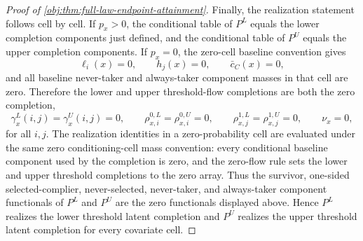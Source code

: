 \documentclass[11pt]{article}
\begin{document}
\begin{proof}[Proof of \cref{obj:thm:full-law-endpoint-attainment}]
Finally, the realization statement follows cell by cell.  If \(p_x>0\), the conditional table of \(P^L\) equals the lower completion components just defined, and the conditional table of \(P^U\) equals the upper completion components. %
If \(p_x=0\), the zero-cell baseline convention gives
\[
\ell_i(x)=0,\qquad h_j(x)=0,\qquad \bar c_C(x)=0,
\]
and all baseline never-taker and always-taker component masses in that cell are zero.  Therefore the lower and upper threshold-flow completions are both the zero completion,
\[
\gamma^L_x(i,j)=\gamma^U_x(i,j)=0,\qquad
\rho^{0,L}_{x,i}=\rho^{0,U}_{x,i}=0,\qquad
\rho^{1,L}_{x,j}=\rho^{1,U}_{x,j}=0,
\qquad
\nu_x=0,
\]
for all \(i,j\).  The realization identities in a zero-probability cell are evaluated under the same zero conditioning-cell mass convention: every conditional baseline component used by the completion is zero, and the zero-flow rule sets the lower and upper threshold completions to the zero array.  Thus the survivor, one-sided selected-complier, never-selected, never-taker, and always-taker component functionals of \(P^L\) and \(P^U\) are the zero functionals displayed above. %
Hence \(P^L\) realizes the lower threshold latent completion and \(P^U\) realizes the upper threshold latent completion for every covariate cell. %
\end{proof}
\end{document}
